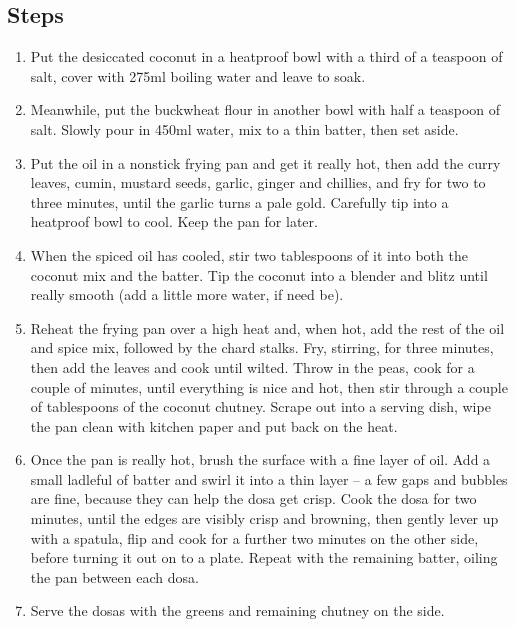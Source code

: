 \documentclass{book}
\begin{document}
\subsection*{Steps}
\begin{enumerate}
\item Put the desiccated coconut in a heatproof bowl with a third of a teaspoon of salt, cover with 275ml boiling water and leave to soak.
\item Meanwhile, put the buckwheat flour in another bowl with half a teaspoon of salt. Slowly pour in 450ml water, mix to a thin batter, then set aside.
\item Put the oil in a nonstick frying pan and get it really hot, then add the curry leaves, cumin, mustard seeds, garlic, ginger and chillies, and fry for two to three minutes, until the garlic turns a pale gold. Carefully tip into a heatproof bowl to cool. Keep the pan for later.
\item When the spiced oil has cooled, stir two tablespoons of it into both the coconut mix and the batter. Tip the coconut into a blender and blitz until really smooth (add a little more water, if need be).
\item Reheat the frying pan over a high heat and, when hot, add the rest of the oil and spice mix, followed by the chard stalks. Fry, stirring, for three minutes, then add the leaves and cook until wilted. Throw in the peas, cook for a couple of minutes, until everything is nice and hot, then stir through a couple of tablespoons of the coconut chutney. Scrape out into a serving dish, wipe the pan clean with kitchen paper and put back on the heat.
\item Once the pan is really hot, brush the surface with a fine layer of oil. Add a small ladleful of batter and swirl it into a thin layer – a few gaps and bubbles are fine, because they can help the dosa get crisp. Cook the dosa for two minutes, until the edges are visibly crisp and browning, then gently lever up with a spatula, flip and cook for a further two minutes on the other side, before turning it out on to a plate. Repeat with the remaining batter, oiling the pan between each dosa.
\item Serve the dosas with the greens and remaining chutney on the side.
\end{enumerate}
\newpage
\end{document}
